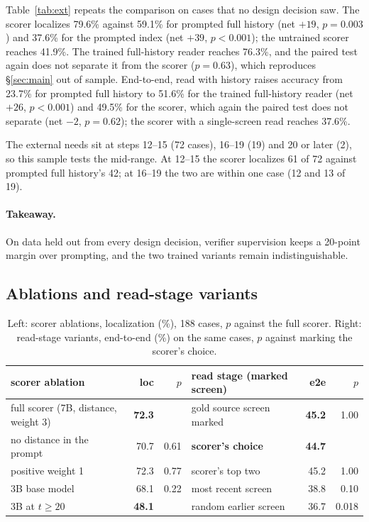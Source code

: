 Table~\ref{tab:ext} repeats the comparison on cases that no design decision saw. The scorer localizes 79.6\% against 59.1\% for prompted full history (net $+19$, $p=0.003$) and 37.6\% for the prompted index (net $+39$, $p<0.001$); the untrained scorer reaches 41.9\%. The trained full-history reader reaches 76.3\%, and the paired test again does not separate it from the scorer ($p=0.63$), which reproduces \S\ref{sec:main} out of sample. End-to-end, read with history raises accuracy from 23.7\% for prompted full history to 51.6\% for the trained full-history reader (net $+26$, $p<0.001$) and 49.5\% for the scorer, which again the paired test does not separate (net $-2$, $p=0.62$); the scorer with a single-screen read reaches 37.6\%.

The external needs sit at steps 12--15 (72 cases), 16--19 (19) and 20 or later (2), so this sample tests the mid-range. At 12--15 the scorer localizes 61 of 72 against prompted full history's 42; at 16--19 the two are within one case (12 and 13 of 19).

\paragraph{Takeaway.} On data held out from every design decision, verifier supervision keeps a 20-point margin over prompting, and the two trained variants remain indistinguishable.

\subsection{Ablations and read-stage variants}
\label{sec:ablation}
\begin{table}[t]
\centering\scriptsize
\caption{Left: scorer ablations, localization (\%), 188 cases, $p$ against the full scorer. Right: read-stage variants, end-to-end (\%) on the same cases, $p$ against marking the scorer's choice.}
\label{tab:abl}
\begin{tabular}{lrr@{\hspace{1.5em}}lrr}
\toprule
scorer ablation & loc & $p$ & read stage (marked screen) & e2e & $p$ \\
\midrule
full scorer (7B, distance, weight 3) & \textbf{72.3} & & gold source screen marked & \textbf{45.2} & 1.00 \\
no distance in the prompt & 70.7 & 0.61 & \textbf{scorer's choice} & \textbf{44.7} & \\
positive weight 1 & 72.3 & 0.77 & scorer's top two & 45.2 & 1.00 \\
3B base model & 68.1 & 0.22 & most recent screen & 38.8 & 0.10 \\
\quad 3B at $t\ge20$ & \textbf{48.1} & & random earlier screen & 36.7 & 0.018 \\
\bottomrule
\end{tabular}
\end{table}

